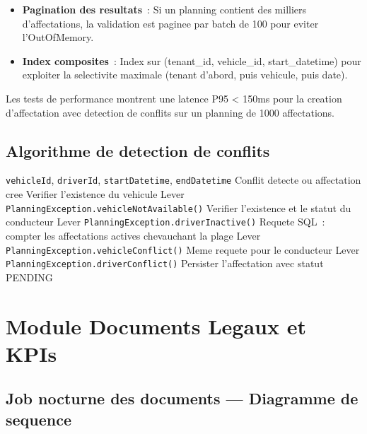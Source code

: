 \documentclass[12pt,a4paper]{report}
\begin{document}
\begin{enumerate}[leftmargin=2cm]
\begin{itemize}[leftmargin=2cm]
  \item \textbf{Pagination des resultats}~: Si un planning contient des
        milliers d'affectations, la validation est paginee par batch de
        100 pour eviter l'OutOfMemory.
        
  \item \textbf{Index composites}~: Index sur (tenant\_id, vehicle\_id,
        start\_datetime) pour exploiter la selectivite maximale (tenant
        d'abord, puis vehicule, puis date).
\end{itemize}

Les tests de performance montrent une latence P95 < 150ms pour la creation
d'affectation avec detection de conflits sur un planning de 1000 affectations.

\section{Algorithme de detection de conflits}

\begin{algorithm}[H]
\caption{Detection de conflits lors d'une creation d'affectation}
\label{alg:conflict}
\begin{algorithmic}[1]
\Require \texttt{vehicleId}, \texttt{driverId},
         \texttt{startDatetime}, \texttt{endDatetime}
\Ensure Conflit detecte ou affectation cree
\State Verifier l'existence du vehicule
  \State Lever \texttt{PlanningException.vehicleNotAvailable()}
\EndIf
\State Verifier l'existence et le statut du conducteur
  \State Lever \texttt{PlanningException.driverInactive()}
\EndIf
\State Requete SQL~: compter les affectations actives chevauchant la plage
  \State Lever \texttt{PlanningException.vehicleConflict()} 
\EndIf
\State Meme requete pour le conducteur
  \State Lever \texttt{PlanningException.driverConflict()} 
\EndIf
\State Persister l'affectation avec statut PENDING
\end{algorithmic}
\end{algorithm}

\chapter{Module Documents Legaux et KPIs}

\section{Job nocturne des documents --- Diagramme de sequence}


\end{enumerate}
\end{document}
